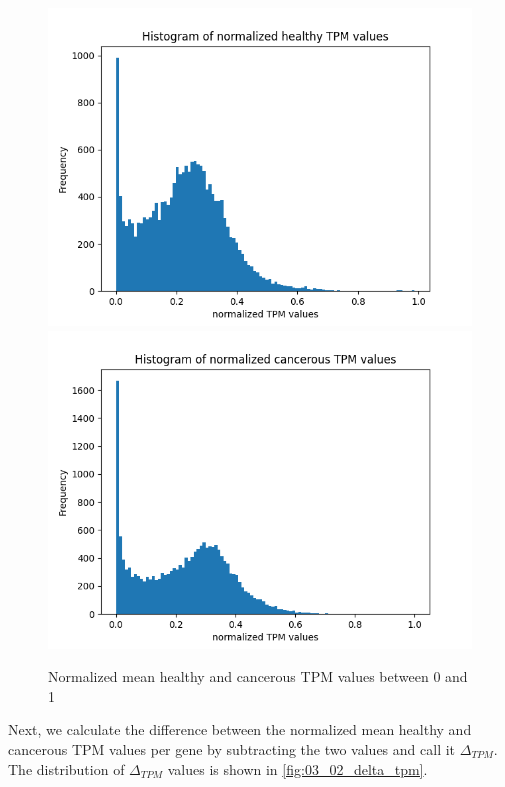 \begin{figure}[h]
    \includegraphics[width=\linewidth]{figures/03_02_normalized_gtex_tpm}
\endminipage
\hfill
{}
  \includegraphics[width=\linewidth]{figures/03_02_normalized_cmp_tpm}
\endminipage
\caption{Normalized mean healthy and cancerous TPM values between 0 and 1}
\label{fig:03_02_normalized_tpm_both}
\end{figure}


Next, we calculate the difference between the normalized mean healthy and cancerous TPM values per gene
by subtracting the two values and call it $\Delta_{TPM}$.
The distribution of $\Delta_{TPM}$ values is shown in \cref{fig:03_02_delta_tpm}.

